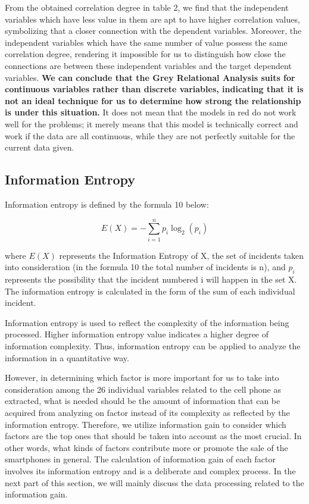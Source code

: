 	From the obtained correlation degree in table 2, we find that the independent variables which have less value in them are apt to have higher correlation values, symbolizing that a closer connection with the dependent variables. Moreover, the independent variables which have the same number of value possess the same correlation degree, rendering it impossible for us to distinguish how close the connections are between these independent variables and the target dependent variables. \textbf{We can conclude that the Grey Relational Analysis suits for continuous variables rather than discrete variables, indicating that it is not an ideal technique for us to determine how strong the relationship is under this situation.} It does not mean that the models in red do not work well for the problems; it merely means that this model is technically correct and work if the data are all continuous, while they are not perfectly suitable for the current data given. 
	
	\subsection{Information Entropy}
	
	Information entropy is defined by the formula 10 below:
	
	\begin{equation}
	E ( X ) = - \sum _ { i = 1 } ^ { n } p _ { i } \log _ { 2 } \left( p _ { i } \right)
	\end{equation}
	
	where $E ( X )$ represents the Information Entropy of X, the set of incidents taken into consideration (in the formula 10 the total number of incidents is n), and $p _ { i }$ represents the possibility that the incident numbered i will happen in the set X. The information entropy is calculated in the form of the sum of each individual incident. 
	
Information entropy is used to reflect the complexity of the information being processed. Higher information entropy value indicates a higher degree of information complexity. Thus, information entropy can be applied to analyze the information in a quantitative way.

However, in determining which factor is more important for us to take into consideration among the 26 individual variables related to the cell phone as extracted, what is needed should be the amount of information that can be acquired from analyzing on factor instead of its complexity as reflected by the information entropy. Therefore, we utilize information gain to consider which factors are the top ones that should be taken into account as the most crucial. In other words, what kinds of factors contribute more or promote the sale of the smartphones in general. The calculation of information gain of each factor involves its information entropy and is a deliberate and complex process. In the next part of this section, we will mainly discuss the data processing related to the information gain.

